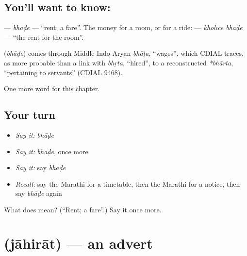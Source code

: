 \subsection*{You'll want to know: }
\textbf{} — \emph{bhāḍe} — \textquotedblleft{}rent; a fare\textquotedblright{}. The money for a room, or for a ride: \textbf{ } — \emph{kholīce bhāḍe} — \textquotedblleft{}the rent for the room\textquotedblright{}.

\begin{cousinweb}
\textbf{} (\emph{bhāḍe}) comes through Middle Indo-Aryan \emph{bhāṭa}, \textquotedblleft{}wages\textquotedblright{}, which CDIAL traces, as more probable than a link with \emph{bhṛta}, \textquotedblleft{}hired\textquotedblright{}, to a reconstructed \emph{*bhārta}, \textquotedblleft{}pertaining to servants\textquotedblright{} (CDIAL 9468).
\end{cousinweb}

\begin{grammarlens}[title={What you've built}]
One more word for this chapter.
\end{grammarlens}

\subsection*{Your turn}
\begin{itemize}
\raggedright
  \item \emph{Say it:} \emph{bhāḍe}
  \item \emph{Say it:} \emph{bhāḍe}, once more
  \item \emph{Say it:} say \emph{bhāḍe}
  \item \emph{Recall:} say the Marathi for a timetable, then the Marathi for a notice, then say \emph{bhāḍe} again
\end{itemize}

\begin{tcolorbox}[breakable,colback=teal!4,colframe=teal!35!black,title={Before you move on}]
What does  mean? (\textquotedblleft{}Rent; a fare\textquotedblright{}.) Say it once more.
\end{tcolorbox}
\section[\texorpdfstring{\mr{जाहिरात} (jāhirāt)}{जाहिरात (jāhirāt)}]{ (jāhirāt) — an advert}

\label{lesson:MR-C161-jahirat}



